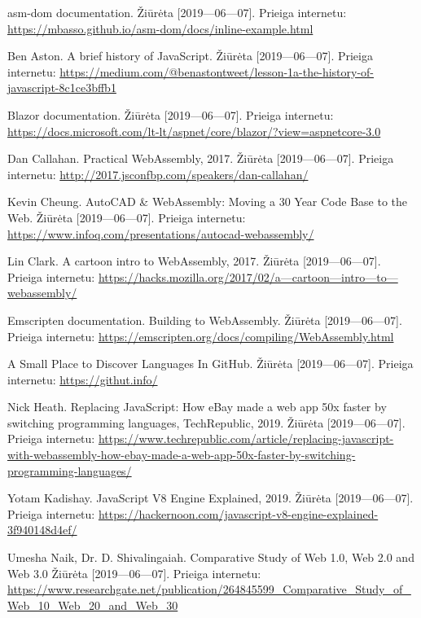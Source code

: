 \documentclass{VUMIFPSkursinis}
\begin{document}
\begin{thebibliography}{99}

asm-dom documentation. Žiūrėta [2019—06—07]. Prieiga internetu: \url{https://mbasso.github.io/asm-dom/docs/inline-example.html}

Ben Aston. A brief history of JavaScript. Žiūrėta [2019—06—07]. Prieiga internetu: \url{https://medium.com/@benastontweet/lesson-1a-the-history-of-javascript-8c1ce3bffb1}

Blazor documentation. Žiūrėta [2019—06—07]. Prieiga internetu: \url{https://docs.microsoft.com/lt-lt/aspnet/core/blazor/?view=aspnetcore-3.0}

Dan Callahan. Practical WebAssembly, 2017. Žiūrėta [2019—06—07]. Prieiga internetu: \url{http://2017.jsconfbp.com/speakers/dan-callahan/}

Kevin Cheung. AutoCAD & WebAssembly: Moving a 30 Year Code Base to the Web. Žiūrėta [2019—06—07]. Prieiga internetu: \url{https://www.infoq.com/presentations/autocad-webassembly/}

Lin Clark. A cartoon intro to WebAssembly, 2017. Žiūrėta [2019—06—07]. Prieiga internetu: \url{https://hacks.mozilla.org/2017/02/a—cartoon—intro—to—webassembly/}

Emscripten documentation. Building to WebAssembly. Žiūrėta [2019—06—07]. Prieiga internetu: \url{https://emscripten.org/docs/compiling/WebAssembly.html}

A Small Place to Discover Languages In GitHub. Žiūrėta [2019—06—07]. Prieiga internetu: \url{https://githut.info/}

Nick Heath. Replacing JavaScript: How eBay made a web app 50x faster by switching programming languages, TechRepublic, 2019. Žiūrėta [2019—06—07]. Prieiga internetu:
\url{https://www.techrepublic.com/article/replacing-javascript-with-webassembly-how-ebay-made-a-web-app-50x-faster-by-switching-programming-languages/}

Yotam Kadishay. JavaScript V8 Engine Explained, 2019. Žiūrėta [2019—06—07]. Prieiga internetu: \url{https://hackernoon.com/javascript-v8-engine-explained-3f940148d4ef/}

Umesha Naik, Dr. D. Shivalingaiah. Comparative Study of Web 1.0, Web 2.0 and Web 3.0  Žiūrėta [2019—06—07]. Prieiga internetu: \url{https://www.researchgate.net/publication/264845599_Comparative_Study_of_Web_10_Web_20_and_Web_30}


\end{thebibliography}
\end{document}

